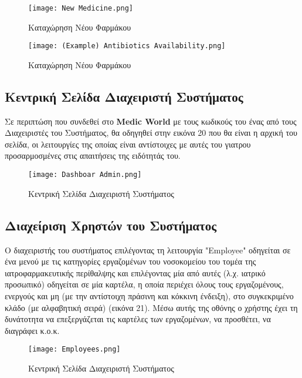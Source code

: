 \documentclass{article}
\begin{document}
\newpage

\begin{figure}[!htb]
\centering
\texttt{[image: New Medicine.png]} 
\caption{\label{fig:new medicine} Καταχώρηση Νέου Φαρμάκου}
\end{figure}

\vspace{0.3cm}

\begin{figure}[!htb]
\centering
\texttt{[image: (Example) Antibiotics Availability.png]} 
\caption{\label{fig:antibiotics} Καταχώρηση Νέου Φαρμάκου}
\end{figure}

\subsection{Κεντρική Σελίδα Διαχειριστή Συστήματος}
Σε περιπτώση που συνδεθεί στο \textbf{Medic World} με τους κωδικούς του ένας από τους Διαχειριστές του Συστήματος, θα οδηγηθεί στην εικόνα 20 που θα είναι η αρχική του σελίδα, οι λειτουργίες της οποίας είναι αντίστοιχες με αυτές του γιατρου προσαρμοσμένες στις απαιτήσεις της ειδότητάς του.

\newpage

\begin{figure}[!htb]
\centering
\texttt{[image: Dashboar Admin.png]} 
\caption{\label{fig:dashboard admin} Κεντρική Σελίδα Διαχειριστή Συστήματος}
\end{figure}

\subsection{Διαχείριση Χρηστών του Συστήματος}

Ο διαχειριστής του συστήματος επιλέγοντας τη λειτουργία "Employee" οδηγείται σε ένα μενού με τις κατηγορίες εργαζομένων του νοσοκομείου του τομέα της ιατροφαρμακευτικής περίθαλψης και επιλέγοντας μία από αυτές (λ.χ. ιατρικό προσωπικό) οδηγείται σε μία καρτέλα, η οποία περιέχει όλους τους εργαζομένους, ενεργούς και μη (με την αντίστοιχη πράσινη και κόκκινη ένδειξη), στο συγκεκριμένο κλάδο (με αλφαβητική σειρά) (εικόνα 21). Μέσω αυτής της οθόνης ο χρήστης έχει τη δυνάτοτητα να επεξεργάζεται τις καρτέλες των εργαζομένων, να προσθέτει, να διαγράφει κ.ο.κ.

\vspace{0.3cm}

\begin{figure}[!htb]
\centering
\texttt{[image: Employees.png]} 
\caption{\label{fig:main page (admin)} Κεντρική Σελίδα Διαχειριστή Συστήματος}
\end{figure}
\end{document}
